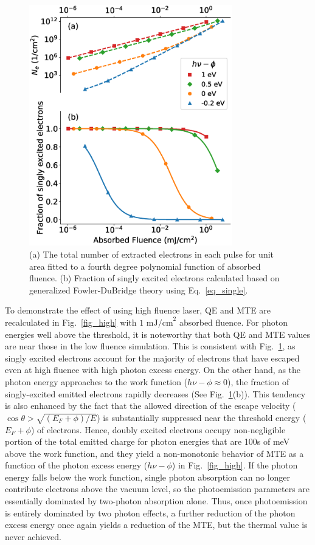 \begin{figure}
	\centering
	\includegraphics*[width=250pt]{figs/boltzmann/single.eps}
	\caption{(a) The total number of extracted electrons in each pulse for unit area fitted to a fourth degree polynomial function of absorbed fluence. (b) Fraction of singly excited electrons calculated based on generalized Fowler-DuBridge theory using Eq.~\ref{eq_single}.}
	\label{fig_single}
\end{figure}

To demonstrate the effect of using high fluence laser, QE and MTE are recalculated in Fig.~\ref{fig_high} with  $1 \textrm{ mJ/cm}^2$ absorbed fluence. For photon energies well above the threshold, it is noteworthy that both QE and MTE values are near those in the low fluence simulation. This is consistent with Fig.~\ref{fig_single}, as singly excited electrons account for the majority of electrons that have escaped even at high fluence with high photon excess energy.
On the other hand, as the photon energy approaches to the work function ($h\nu - \phi \approx 0$), the fraction of singly-excited emitted electrons rapidly decreases (See Fig.~\ref{fig_single}(b)). This tendency is also enhanced by the fact that the allowed direction of the escape velocity ($ \cos\theta > \sqrt{(E_F + \phi)/E}$) is substantially suppressed near the threshold energy ($E_F + \phi$) of electrons.
Hence, doubly excited electrons occupy non-negligible portion of the total emitted charge for photon energies that are 100s of meV above the work function, and they yield a non-monotonic behavior of MTE as a function of the photon excess energy ($h\nu - \phi$) in Fig.~\ref{fig_high}.
If the photon energy falls below the work function, single photon absorption can no longer contribute electrons above the vacuum level, so the photoemission parameters are essentially dominated by two-photon absorption alone. Thus, once photoemission is entirely dominated by two photon effects, a further reduction of the photon excess energy once again yields a reduction of the MTE, but the thermal value is never achieved.

